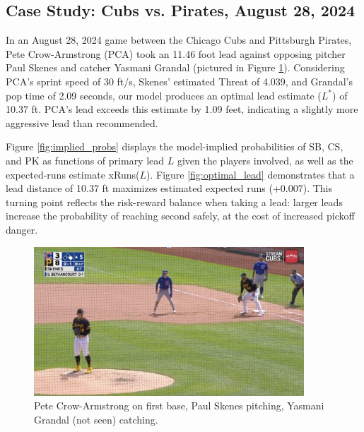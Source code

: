 \documentclass[12pt,letterpaper]{article}
\begin{document}
\subsection{Case Study: Cubs vs. Pirates, August 28, 2024}

In an August 28, 2024 game between the Chicago Cubs and Pittsburgh Pirates, Pete Crow-Armstrong (PCA) took an 11.46 foot lead against opposing pitcher Paul Skenes and catcher Yasmani Grandal (pictured in Figure \ref{fig:example_case}). Considering PCA's sprint speed of 30 ft/s, Skenes' estimated Threat of 4.039, and Grandal's pop time of 2.09 seconds, our model produces an optimal lead estimate ($L^*$) of 10.37 ft. PCA's lead exceeds this estimate by 1.09 feet, indicating a slightly more aggressive lead than recommended.

Figure \ref{fig:implied_probs} displays the model-implied probabilities of SB, CS, and PK as functions of primary lead $L$ given the players involved, as well as the expected-runs estimate xRuns($L$). Figure \ref{fig:optimal_lead} demonstrates that a lead distance of 10.37 ft maximizes estimated expected runs (+0.007). This turning point reflects the risk-reward balance when taking a lead: larger leads increase the probability of reaching second safely, at the cost of increased pickoff danger.
 
\begin{figure}[H]
    \centering
    \includegraphics[width=0.9\textwidth]{figures/pca.png}
    \caption{Pete Crow-Armstrong on first base, Paul Skenes pitching, Yasmani Grandal (not seen) catching. \citep{CubsvPirates2024}}
    \label{fig:example_case}
\end{figure}
\end{document}
